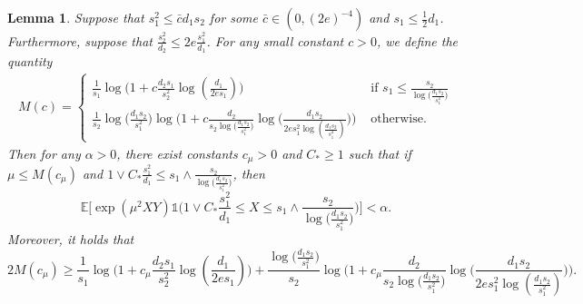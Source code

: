\documentclass{article}
\newcommand{\EE}{\mathbb{E}}
\newcommand{\one}{\mathds{1}}
\newcommand{\Ct}{C_{*}}
\newcommand{\ju}[1]{{\color{purple}Julien: #1}}
\newcommand{\pa}[1]{{\color{red}Parker: #1}}
\newtheorem{lemma}{Lemma}
\theoremstyle{remark}
\begin{document}
% 
% 
% 
\begin{lemma}\label{lem_lb_s1d1big_truncchi2}
    Suppose that $s_1^2 \leq \bar{c}d_1s_2$ for some $\bar{c} \in (0,(2e)^{-4})$ and $s_1 \leq \frac12d_1$. Furthermore, suppose that $\frac{s^2_2}{d_2} \leq 2e\frac{s_1^2}{d_1}$. For any small constant $c > 0$, we define the quantity
    \begin{align*}
        M(c) = \begin{cases}
            \frac{1}{s_1}\log\Big(1 + c \frac{d_2s_1}{s_2^2}\log(\frac{d_1}{2es_1})\Big) & \text{ if } s_1 \leq \frac{s_2}{\log\big(\frac{d_1s_2}{s_1^2}\big)}\\
            \frac{1}{s_2}\log\big(\frac{d_1s_2}{s_1^2}\big)\log\Big(1 + c \frac{d_2}{s_2\log\big(\frac{d_1s_2}{s_1^2}\big)}\log\big(\frac{d_1s_2}{2es_1^2\log(\frac{d_1s_2}{s_1^2})}\big)\Big) & \text{ otherwise.}
        \end{cases}
    \end{align*}
    Then for any $\alpha > 0$, there exist constants $c_\mu > 0$ and $C_* \geq 1$ such that if $\mu \leq M(c_\mu)$ and $1 \vee \Ct \frac{s_1^2}{d_1}\leq s_1 \wedge\frac{s_2}{\log\big(\frac{d_1s_2}{s_1^2}\big)}$, then 
    \[\EE\Big[\exp(\mu^2XY)\one\Big( 1 \vee \Ct \frac{s_1^2}{d_1} \leq X \leq s_1\wedge\frac{s_2}{\log\big(\frac{d_1s_2}{s_1^2}\big)}\Big)\Big] < \alpha.\]
    Moreover, it holds that    
    $$2M(c_\mu) \geq \frac{1}{s_1}\log\Big(1 + c_\mu \frac{d_2s_1}{s_2^2}\log(\frac{d_1}{2es_1})\Big) + \frac{\log\big(\frac{d_1s_2}{s_1^2}\big)}{s_2}\log\Big(1 + c_\mu \frac{d_2}{s_2\log\big(\frac{d_1s_2}{s_1^2}\big)}\log\big(\frac{d_1s_2}{2es_1^2\log(\frac{d_1s_2}{s_1^2})}\big)\Big).$$
\end{lemma}
\end{document}
